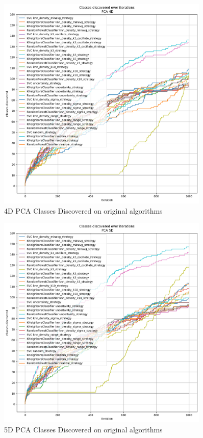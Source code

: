 \begin{figure}[htbp]
    \centering
    \includegraphics[width=0.9\textwidth]{resources/images/classes_discovered_pca_4d.png}
    \caption{4D PCA Classes Discovered on original algorithms}
\end{figure}

\begin{figure}[htbp]
    \centering
    \includegraphics[width=0.9\textwidth]{resources/images/classes_discovered_pca_5d.png}
    \caption{5D PCA Classes Discovered on original algorithms}
\end{figure}

